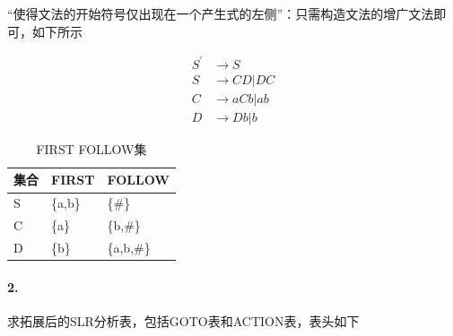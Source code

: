 \documentclass[UTF8]{ctexart} %
\begin{document}
“使得文法的开始符号仅出现在一个产生式的左侧”：只需构造文法的增广文法即可，如下所示

\begin{equation}
    \begin{aligned}
        S^{'} & \rightarrow S      \\
        S     & \rightarrow CD|DC  \\
        C     & \rightarrow aCb|ab \\
        D     & \rightarrow Db|b
    \end{aligned}
\end{equation}

\begin{table}[H]
    \centering
    \begin{tabular}{|p{2cm}<{\centering}|p{3cm}<{\centering}|p{3cm}<{\centering}|}
        \hline
        集合 & FIRST   & FOLLOW     \\
        \hline
        S  & \{a,b\} & \{\#\}     \\
        \hline
        C  & \{a\}   & \{b,\#\}   \\
        \hline
        D  & \{b\}   & \{a,b,\#\} \\
        \hline
    \end{tabular}
    \caption{FIRST FOLLOW集}
\end{table}

\paragraph{2.} 求拓展后的SLR分析表，包括GOTO表和ACTION表，表头如下
\end{document}
